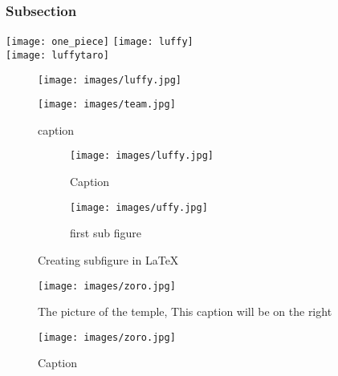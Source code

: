 \documentclass{report}
\begin{document}
\subsubsection{\large Subsection}

\lipsum[1-2]
\texttt{[image: one\_piece]}
\texttt{[image: luffy]} \\
\texttt{[image: luffytaro]}
\lipsum[1-2]
\begin{wrapfigure}{r}{0.25\textwidth}
    \centering  
    \texttt{[image: images/luffy.jpg]}
\end{wrapfigure}
\lipsum[1-2]
\begin{figure}[b] %
    \centering
    \texttt{[image: images/team.jpg]}
    \caption{caption}
    \label{fig:enter-label}
\end{figure}
\lipsum[1-2]
\begin{figure}
    \centering
    \begin{subfigure}{0.4\textwidth}
       \texttt{[image: images/luffy.jpg]}
    \caption{Caption}
    \label{fig:enter-label} 
    \end{subfigure}
    \hfill
    \begin{subfigure}{0.4\textwidth}
        \texttt{[image: images/uffy.jpg]}
        \label{fig:first}
        \caption{first sub figure }
    \end{subfigure}
\caption{Creating subfigure in \LaTeX}
\label{fig:figures}
\end{figure}
\begin{SCfigure}[0.5][h]
    \caption{The picture of the temple, This caption will be on the right}
    \texttt{[image: images/zoro.jpg]}
\end{SCfigure}
\begin{figure}[h!]
    \centering
    \texttt{[image: images/zoro.jpg]}
    \caption{Caption}
    \label{fig:enter-label}
\end{figure}
\lipsum[1-2]
\end{document}
